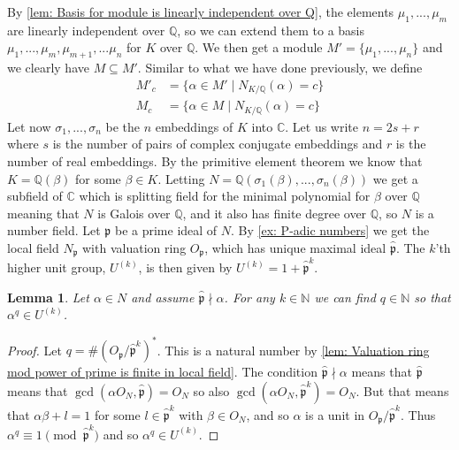 \documentclass{article}
\newtheorem{lemma}{Lemma}[section]
\newcommand{\mfrak}[1]{\mathfrak{#1}}
\newcommand{\mbb}[1]{\mathbb{#1}}
\begin{document}
By \cref{lem: Basis for module is linearly independent over Q}, the elements $\mu_1, ..., \mu_m$ are linearly independent over $\mbb Q$, so we can extend them to a basis $\mu_1, ...,\mu_{m}, \mu_{m+1}, ... \mu_n$ for $K$ over $\mbb Q$. We then get a module $M' = \{ \mu_1, ..., \mu_n\}$ and we clearly have $M \subseteq M'$. Similar to what we have done previously, we define 
\begin{align*}
    M'_c &= \{\alpha \in M' \mid N_{K / \mbb Q}(\alpha) = c \} \\
    M_c &= \{\alpha \in M \mid N_{K / \mbb Q}(\alpha) = c \}  
\end{align*}
Let now $\sigma_1, ..., \sigma_n$ be the $n$ embeddings of $K$ into $\mbb C$. Let us write $n = 2s + r$ where $s$ is the number of pairs of complex conjugate embeddings and $r$ is the number of real embeddings. By the primitive element theorem we know that $K = \mbb Q(\beta)$ for some $\beta \in K$. Letting $N = \mbb Q(\sigma_1(\beta), ..., \sigma_n(\beta))$ we get a subfield of $\mbb C$ which is splitting field for the minimal polynomial for $\beta$ over $\mbb Q$ meaning that $N$ is Galois over $\mbb Q$, and it also has finite degree over $\mbb Q$, so $N$ is a number field. Let $\mfrak p$ be a prime ideal of $N$. By \cref{ex: P-adic numbers} we get the local field $N_{\mfrak p}$ with valuation ring $O_{\mfrak p}$, which has unique maximal ideal $\hat {\mfrak p}$. The $k$'th higher unit group, $U^{(k)}$, is then given by $U^{(k)} = 1 + \hat {\mfrak p}^k$. 

\begin{lemma}\label{lem: Elements can be mapped to U^(k)}
    Let $\alpha \in N$ and assume $\hat {\mfrak p} \nmid \alpha$. For any $k \in \mbb N$ we can find $q \in \mbb N$ so that $\alpha^q \in U^{(k)}$.
\end{lemma}

\begin{proof}
    Let $q = \# (O_\mfrak p / \hat {\mfrak p}^k)^*$. This is a natural number by \cref{lem: Valuation ring mod power of prime is finite in local field}. The condition $\hat{\mfrak p}\nmid \alpha$ means that $\hat {\mfrak p}$ means that $\gcd(\alpha O_N, \hat {\mfrak p}) = O_N$ so also $\gcd(\alpha O_N, \hat {\mfrak p}^k) = O_N$. But that means that $\alpha \beta + l = 1$ for some $l \in {\hat {\mfrak p}}^k$ with $\beta \in O_N$, and so $\alpha$ is a unit in $O_\mfrak p / \hat {\mfrak p}^k$. Thus $\alpha^q \equiv 1 \pmod {\hat{\mfrak p}^k}$ and so $\alpha^q \in U^{(k)}$. 
\end{proof}
\end{document}
